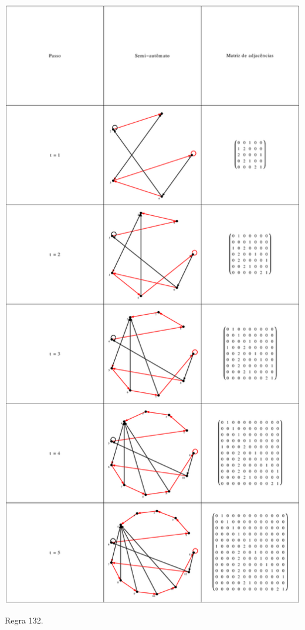 \documentclass[12pt,a4paper]{article}
\begin{document}
\begin{table}[H]
\begin{center}
\includegraphics[scale=0.32]{img/mat/matr132.eps}
\caption{Regra 132.}
\label{tab:mr132}
\end{center}
\end{table}
\end{document}
